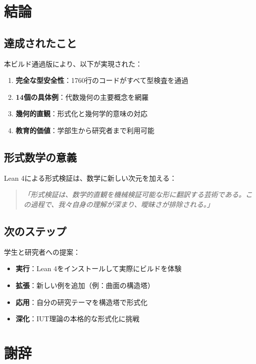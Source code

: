 \documentclass{ltjsarticle}
\begin{document}
\section{結論}

\subsection{達成されたこと}

本ビルド通過版により、以下が実現された：

\begin{enumerate}
\item \textbf{完全な型安全性}：1760行のコードがすべて型検査を通過
\item \textbf{14個の具体例}：代数幾何の主要概念を網羅
\item \textbf{幾何的直観}：形式化と幾何学的意味の対応
\item \textbf{教育的価値}：学部生から研究者まで利用可能
\end{enumerate}

\subsection{形式数学の意義}

Lean 4による形式検証は、数学に新しい次元を加える：

\begin{quote}
\textit{「形式検証は、数学的直観を機械検証可能な形に翻訳する芸術である。この過程で、我々自身の理解が深まり、曖昧さが排除される。」}
\end{quote}

\subsection{次のステップ}

学生と研究者への提案：

\begin{itemize}
\item \textbf{実行}：Lean 4をインストールして実際にビルドを体験
\item \textbf{拡張}：新しい例を追加（例：曲面の構造塔）
\item \textbf{応用}：自分の研究テーマを構造塔で形式化
\item \textbf{深化}：IUT理論の本格的な形式化に挑戦
\end{itemize}

\section*{謝辞}
\end{document}
